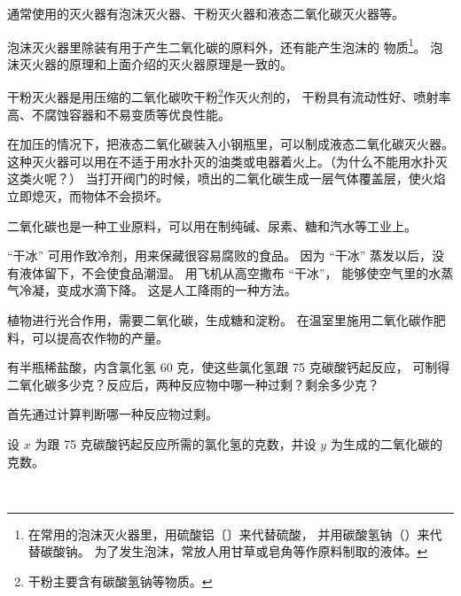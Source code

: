 通常使用的灭火器有泡沫灭火器、干粉灭火器和液态二氧化碳灭火器等。

\begin{yuedu}
    泡沫灭火器里除装有用于产生二氧化碳的原料外，还有能产生泡沫的
    物质\footnote{在常用的泡沫灭火器里，用硫酸铝〔〕来代替硫酸，
        并用碳酸氢钠（）来代替碳酸钠。
        为了发生泡沫，常放人用甘草或皂角等作原料制取的液体。
    }。
    泡沫灭火器的原理和上面介绍的灭火器原理是一致的。

    干粉灭火器是用压缩的二氧化碳吹干粉\footnote{干粉主要含有碳酸氢钠等物质。}作灭火剂的，
    干粉具有流动性好、喷射率高、不腐蚀容器和不易变质等优良性能。

    在加压的情况下，把液态二氧化碳装入小钢瓶里，可以制成液态二氧化碳灭火器。
    这种灭火器可以用在不适于用水扑灭的油类或电器着火上。（为什么不能用水扑灭这类火呢？）
    当打开阀门的时候，喷出的二氧化碳生成一层气体覆盖层，使火焰立即熄灭，而物体不会损坏。
\end{yuedu}

二氧化碳也是一种工业原料，可以用在制纯碱、尿素、糖和汽水等工业上。

“干冰” 可用作致冷剂，用来保藏很容易腐败的食品。
因为 “干冰” 蒸发以后，没有液体留下，不会使食品潮湿。
用飞机从高空撒布 “干冰”， 能够使空气里的水蒸气冷凝，变成水滴下降。
这是人工降雨的一种方法。

植物进行光合作用，需要二氧化碳，生成糖和淀粉。
在温室里施用二氧化碳作肥料，可以提高农作物的产量。


\liti[0] 有半瓶稀盐酸，内含氯化氢 60 克，使这些氯化氢跟 75 克碳酸钙起反应，
可制得二氧化碳多少克？反应后，两种反应物中哪一种过剩？剩余多少克？

\jie 首先通过计算判断哪一种反应物过剩。

设 $x$ 为跟 75 克碳酸钙起反应所需的氯化氢的克数，并设 $y$ 为生成的二氧化碳的克数。
\begin{fangchengshi}
     \\[4em]
\end{fangchengshi}

